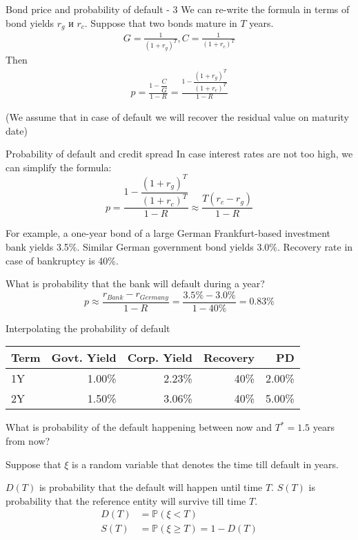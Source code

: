 \documentclass{beamer}
\begin{document}
\begin{frame}{Bond price and probability of default - 3}
\justify
We can re-write the formula in terms of bond yields $r_g$ и $r_c$. Suppose that two bonds mature in $T$ years.
\begin{align*}
G = \frac{1}{(1 + r_g)^T}, C = \frac{1}{(1 + r_c)^T}
\end{align*}
Then
\begin{align*}
p = \frac{1 - \dfrac{C}{G}}{1-R} = \frac{1 - \dfrac{(1 + r_g)^T}{(1 + r_c)^T}}{1 - R}
\end{align*}

\justify
(We assume that in case of default we will recover the residual value on maturity date)
\end{frame}



\begin{frame}{Probability of default and credit spread}
\justify
In case interest rates are not too high, we can simplify the formula:
\begin{equation*}
p = \frac{1 - \dfrac{(1 + r_g)^T}{(1 + r_c)^T}}{1 - R} \approx \frac{T(r_c - r_g)}{1 - R}
\end{equation*}

\justify
For example, a one-year bond of a large German Frankfurt-based investment bank yields 3.5\%. Similar German government bond yields $3.0\%$. Recovery rate in case of bankruptcy is 40\%.

\justify
What is probability that the bank will default during a year?
\begin{equation*}
p \approx \frac{r_{Bank} - r_{Germany}}{1-R} = \frac{3.5\% - 3.0\%}{1-40\%} = 0.83\%
\end{equation*}
\end{frame}



\begin{frame}{Interpolating the probability of default}
\centering
\begin{tabular}{l|r|r|r|r}
Term & Govt. Yield & Corp. Yield & Recovery & PD \\ \hline
1Y & 1.00\% & 2.23\% & 40\% & 2.00\% \\
2Y & 1.50\% & 3.06\% & 40\% & 5.00\%
\end{tabular}

\justify
What is probability of the default happening between now and $T^*=1.5$ years from now?

\justify
Suppose that $\xi$ is a random variable that denotes the time till default in years.

\justify
$D(T)$ is probability that the default will happen until time $T$. $S(T)$ is probability that the reference entity will survive till time $T$.
\begin{align*}
D(T) &= \mathbb{P}(\xi < T) \\
S(T) &= \mathbb{P}(\xi \ge T) = 1 - D(T)
\end{align*}
\end{frame}
 
\end{document}
